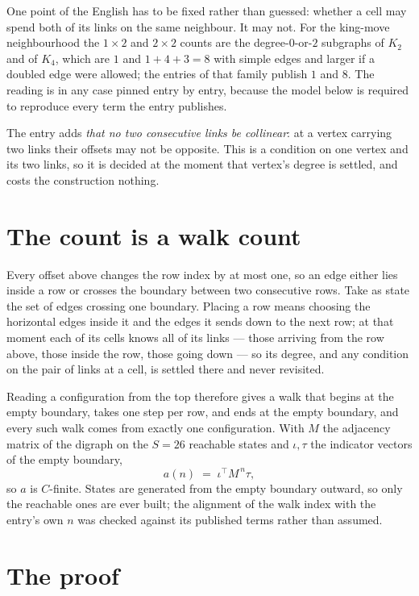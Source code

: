 \documentclass[11pt,a4paper]{article}
\theoremstyle{plain}
\theoremstyle{definition}
\begin{document}
One point of the English has to be fixed rather than guessed: whether a cell may spend both of
its links on the same neighbour. It may not. For the king-move neighbourhood the $1\times2$
and $2\times2$ counts are the degree-$0$-or-$2$ subgraphs of $K_2$ and of $K_4$, which are $1$
and $1+4+3=8$ with simple edges and larger if a doubled edge were allowed; the entries of that
family publish $1$ and $8$. The reading is in any case pinned entry by entry, because the
model below is required to reproduce every term the entry publishes.

The entry adds \emph{that no two consecutive links be collinear}: at a vertex carrying two
links their offsets may not be opposite. This is a condition on one vertex and its two links,
so it is decided at the moment that vertex's degree is settled, and costs the construction
nothing.

\section{The count is a walk count}

Every offset above changes the row index by at most one, so an edge either lies inside a row
or crosses the boundary between two consecutive rows. Take as state the set of edges crossing
one boundary. Placing a row means choosing the horizontal edges inside it and the edges it
sends down to the next row; at that moment each of its cells knows all of its links --- those
arriving from the row above, those inside the row, those going down --- so its degree, and any
condition on the pair of links at a cell, is settled there and never revisited.

Reading a configuration from the top therefore gives a walk that begins at the empty boundary,
takes one step per row, and ends at the empty boundary, and every such walk comes from exactly
one configuration. With $M$ the adjacency matrix of the digraph on the $S=26$ reachable
states and $\iota,\tau$ the indicator vectors of the empty boundary,
\[
a(n)\;=\;\iota^{\!\top}M^{\,n}\tau ,
\]
so $a$ is $C$-finite. States are generated from the empty boundary outward, so only the
reachable ones are ever built; the alignment of the walk index with the entry's own $n$ was
checked against its published terms rather than assumed.

\section{The proof}
\end{document}
